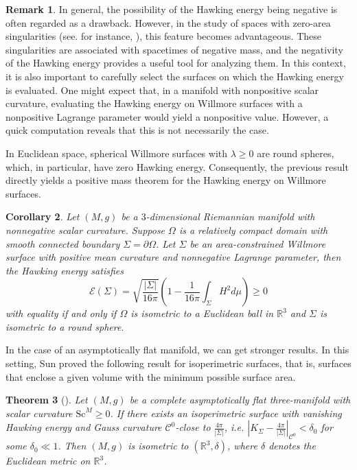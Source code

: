 \documentclass[12pt,a4paper]{amsart}
\theoremstyle{plain}
\newtheorem{theorem}{Theorem}[section]
\newtheorem{corollary}[theorem]{Corollary}
\theoremstyle{definition}
\newtheorem{remark}[theorem]{Remark}
\begin{document}
\begin{remark}
In general, the possibility of the Hawking energy being negative is often regarded as a drawback. However, in the study of spaces with zero-area singularities (see. for instance, \cite{bray2011positive, ajm/1383923956}), this feature becomes advantageous. These singularities are associated with spacetimes of negative mass, and the negativity of the Hawking energy provides a useful tool for analyzing them. 
In this context, it is also important to carefully select the surfaces on which the Hawking energy is evaluated. One might expect that, in a manifold with nonpositive scalar curvature, evaluating the Hawking energy on Willmore surfaces with a nonpositive Lagrange parameter would yield a nonpositive value. However, a quick computation reveals that this is not necessarily the case.


\end{remark}


In Euclidean space, spherical Willmore surfaces with $\lambda \geq 0$ are round spheres, which, in particular, have zero Hawking energy. Consequently, the previous result directly yields a positive mass theorem for the Hawking energy on Willmore surfaces.
\begin{corollary}\label{positivemasshaw}
  Let $(M,g)$ be a $3$-dimensional Riemannian  manifold with nonnegative scalar curvature. Suppose $\Omega$ is a relatively compact domain with smooth connected boundary  $\Sigma=  \partial \Omega $.  Let $\Sigma $ be an  area-constrained Willmore surface with positive mean curvature and nonnegative Lagrange parameter, then the Hawking energy satisfies
  $$  \mathcal{E}(\Sigma) = \sqrt{\frac{|\Sigma|}{16 \pi}} \left( 1- \frac{1}{16 \pi} \int_\Sigma H^2  d\mu \right) \geq 0 $$
  with equality if and only if $\Omega$ is isometric to a Euclidean ball in $\mathbb{R}^3$ and $\Sigma$ is isometric to a round sphere.   
\end{corollary}



In the case of an asymptotically flat manifold, we can get stronger results. In this setting, Sun proved the following result for isoperimetric surfaces, that is, surfaces that enclose a given volume with the minimum possible surface area.

\begin{theorem}[{\cite[Theorem 3]{sun2017rigidity}}]\label{afbrownyork}
    Let \((M, g)\) be a complete asymptotically flat three-manifold with scalar curvature \(  \mathrm{Sc}^M \geq 0\). If there exists an isoperimetric surface with vanishing  Hawking energy and  Gauss curvature  \( \mathcal{C}^0 \)-close to \( \frac{4\pi}{|\Sigma|} \), i.e. \(
|K_{\Sigma} -\frac{4\pi}{|\Sigma|}|_{\mathcal{C}^0} < \delta_0
\) for some \( \delta_0 \ll 1 \). Then \((M, g)\) is isometric to \((\mathbb{R}^3, \delta)\), where \(\delta\) denotes the Euclidean metric on \(\mathbb{R}^3\).
\end{theorem}
\end{document}
